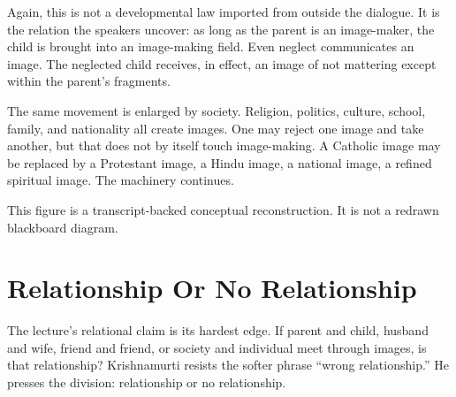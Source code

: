 Again, this is not a developmental law imported from outside the dialogue. It is the relation the speakers uncover: as long as the parent is an image-maker, the child is brought into an image-making field. Even neglect communicates an image. The neglected child receives, in effect, an image of not mattering except within the parent's fragments.

The same movement is enlarged by society. Religion, politics, culture, school, family, and nationality all create images. One may reject one image and take another, but that does not by itself touch image-making. A Catholic image may be replaced by a Protestant image, a Hindu image, a national image, a refined spiritual image. The machinery continues.

\begin{figure}
\centering
{}
\end{figure}

This figure is a transcript-backed conceptual reconstruction. It is not a redrawn blackboard diagram.

\section{Relationship Or No Relationship}

The lecture's relational claim is its hardest edge. If parent and child, husband and wife, friend and friend, or society and individual meet through images, is that relationship? Krishnamurti resists the softer phrase ``wrong relationship.'' He presses the division: relationship or no relationship.

